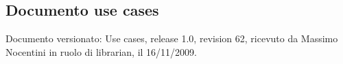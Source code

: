 \subsection{Documento use cases}
Documento versionato: Use cases, release 1.0, revision 62, ricevuto da
Massimo Nocentini in ruolo di librarian, il 16/11/2009.